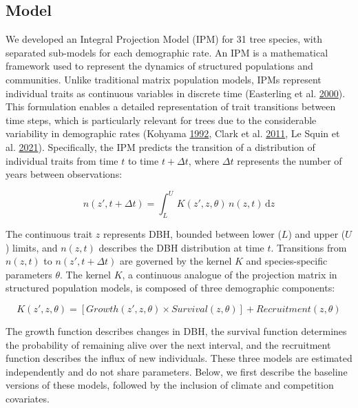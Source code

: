 \documentclass[12pt]{article}
\begin{document}
\hypertarget{model}{%
\subsection{Model}\label{model}}

We developed an Integral Projection Model (IPM) for 31 tree species,
with separated sub-models for each demographic rate. An IPM is a
mathematical framework used to represent the dynamics of structured
populations and communities. Unlike traditional matrix population
models, IPMs represent individual traits as continuous variables in
discrete time (Easterling et al.
\protect\hyperlink{ref-Easterling2000}{2000}). This formulation enables
a detailed representation of trait transitions between time steps, which
is particularly relevant for trees due to the considerable variability
in demographic rates (Kohyama \protect\hyperlink{ref-kohyama1992}{1992},
Clark et al. \protect\hyperlink{ref-Clark2011}{2011}, Le Squin et al.
\protect\hyperlink{ref-LeSquin2021}{2021}). Specifically, the IPM
predicts the transition of a distribution of individual traits from time
\(t\) to time \(t + \Delta t\), where \(\Delta t\) represents the number
of years between observations:

\begin{equation}
n(z', t + \Delta t) = \int_{L}^{U} \, K(z', z, \theta)\, n(z, t)\, \mathrm{d}z
\label{eq:ipm}\end{equation}

The continuous trait \(z\) represents DBH, bounded between lower (\(L\))
and upper (\(U\)) limits, and \(n(z, t)\) describes the DBH distribution
at time \(t\). Transitions from \(n(z, t)\) to \(n(z', t + \Delta t)\)
are governed by the kernel \(K\) and species-specific parameters
\(\theta\). The kernel \(K\), a continuous analogue of the projection
matrix in structured population models, is composed of three demographic
components:

\begin{equation}
K(z', z, \theta) = [Growth(z', z, \theta) \times Survival(z, \theta)] + Recruitment(z, \theta)
\label{eq:kernel}\end{equation}

The growth function describes changes in DBH, the survival function
determines the probability of remaining alive over the next interval,
and the recruitment function describes the influx of new individuals.
These three models are estimated independently and do not share
parameters. Below, we first describe the baseline versions of these
models, followed by the inclusion of climate and competition covariates.
\end{document}
